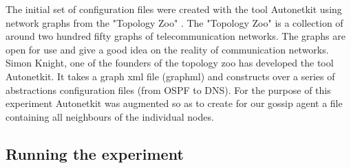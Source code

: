 The initial set of configuration files were created with the tool Autonetkit \cite{autonetkit} using network graphs from the "Topology Zoo" \cite{knight_internet_2011}. The "Topology Zoo" is a collection of around two hundred fifty graphs of telecommunication networks. The graphs are open for use and give a good idea on the reality of communication networks. Simon Knight, one of the founders of the topology zoo has developed the tool Autonetkit. It takes a graph xml file (graphml) and constructs over a series of abstractions configuration files (from OSPF to DNS). For the purpose of this experiment Autonetkit was augmented so as to create for our gossip agent a file containing all neighbours of the individual nodes.

\subsection{Running the experiment}
